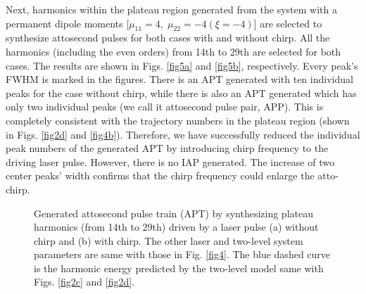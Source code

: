 \documentclass[10pt,letterpaper]{article}
\begin{document}
Next, harmonics within the plateau region generated from the system with a permanent dipole moments [$\mu_{11}=4,\;\mu_{22}=-4(\xi=-4)$]  are selected to synthesize attosecond pulses for both cases with and without chirp. All the harmonics (including the even orders) from 14th to 29th are selected for both cases. The results are shown in Figs. \ref{fig5a} and \ref{fig5b}, respectively. Every peak's FWHM is marked in the figures. There is an APT generated with ten individual peaks for the case without chirp, while there is also an APT generated which has only two individual peaks (we call it attosecond pulse pair, APP). This is completely consistent with the trajectory numbers in the plateau region (shown in Figs. \ref{fig2d} and \ref{fig4b}). Therefore, we have successfully reduced the individual peak numbers of the generated APT by introducing chirp frequency to the driving laser pulse. However, there is no IAP generated. The  increase of two center peaks' width confirms that the chirp frequency could enlarge the atto-chirp.
\begin{figure}[!htbp]
	\centering
	\caption{Generated attosecond pulse train (APT) by synthesizing plateau harmonics (from 14th to 29th) driven by a laser pulse (a) without chirp and (b) with chirp. The other laser and two-level system parameters are same with those in Fig. \ref{fig4}. The blue dashed curve is the harmonic energy predicted by the two-level model same with Figs. \ref{fig2c} and \ref{fig2d}.}
	\label{fig5}
\end{figure}
	
\end{document}
